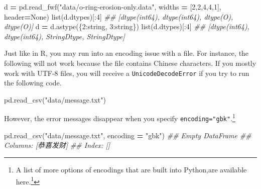 \documentclass[
  12pt,
  krantz2]{krantz}
\makeatletter
\newenvironment{Shaded}{\begin{snugshade}}{\end{snugshade}}
\newcommand{\BuiltInTok}[1]{#1}
\newcommand{\CommentTok}[1]{\textcolor[rgb]{0.37,0.37,0.37}{\textit{#1}}}
\newcommand{\DecValTok}[1]{\textcolor[rgb]{0.06,0.06,0.06}{#1}}
\newcommand{\NormalTok}[1]{#1}
\newcommand{\OperatorTok}[1]{\textcolor[rgb]{0.43,0.43,0.43}{\textbf{#1}}}
\newcommand{\StringTok}[1]{\textcolor[rgb]{0.5,0.5,0.5}{#1}}
\newcommand{\VariableTok}[1]{\textcolor[rgb]{0,0,0}{#1}}
\renewcommand{\href}[2]{#2\footnote{\url{#1}}}
\newenvironment{kframe}{%
\medskip{}
\setlength{\fboxsep}{.8em}
 \def\at@end@of@kframe{}%
 \ifinner\ifhmode%
  \def\at@end@of@kframe{\end{minipage}}%
  \begin{minipage}{\columnwidth}%
 \fi\fi%
 \def\FrameCommand##1{\hskip\@totalleftmargin \hskip-\fboxsep
 \colorbox{shadecolor}{##1}\hskip-\fboxsep
     \hskip-\linewidth \hskip-\@totalleftmargin \hskip\columnwidth}%
 \MakeFramed {\advance\hsize-\width
   \@totalleftmargin\z@ \linewidth\hsize
   \@setminipage}}%
 {\par\unskip\endMakeFramed%
 \at@end@of@kframe}
\renewenvironment{Shaded}{\begin{kframe}}{\end{kframe}}
\makeatother
\begin{document}
\begin{Shaded}
\begin{Highlighting}[]
\NormalTok{d }\OperatorTok{=}\NormalTok{ pd.read\_fwf(}\StringTok{"data/o{-}ring{-}erosion{-}only.data"}\NormalTok{, }
\NormalTok{                  widths }\OperatorTok{=}\NormalTok{ [}\DecValTok{2}\NormalTok{,}\DecValTok{2}\NormalTok{,}\DecValTok{4}\NormalTok{,}\DecValTok{4}\NormalTok{,}\DecValTok{1}\NormalTok{], header}\OperatorTok{=}\VariableTok{None}\NormalTok{)}
\BuiltInTok{list}\NormalTok{(d.dtypes)[:}\DecValTok{4}\NormalTok{]}
\CommentTok{\#\# [dtype(\textquotesingle{}int64\textquotesingle{}), dtype(\textquotesingle{}int64\textquotesingle{}), dtype(\textquotesingle{}O\textquotesingle{}), dtype(\textquotesingle{}O\textquotesingle{})]}
\NormalTok{d }\OperatorTok{=}\NormalTok{ d.astype(\{}\DecValTok{2}\NormalTok{:}\StringTok{\textquotesingle{}string\textquotesingle{}}\NormalTok{, }\DecValTok{3}\NormalTok{:}\StringTok{\textquotesingle{}string\textquotesingle{}}\NormalTok{\}) }
\BuiltInTok{list}\NormalTok{(d.dtypes)[:}\DecValTok{4}\NormalTok{]}
\CommentTok{\#\# [dtype(\textquotesingle{}int64\textquotesingle{}), dtype(\textquotesingle{}int64\textquotesingle{}), StringDtype, StringDtype]}
\end{Highlighting}
\end{Shaded}

Just like in R, you may run into an encoding issue with a file. For instance, the following will not work because the file contains Chinese characters. If you mostly work with UTF-8 files, you will receive a \texttt{UnicodeDecodeError} if you try to run the following code.

\begin{Shaded}
\begin{Highlighting}[]
\NormalTok{pd.read\_csv(}\StringTok{"data/message.txt"}\NormalTok{)}
\end{Highlighting}
\end{Shaded}

However, the error messages disappear when you specify \texttt{encoding="gbk"}.\footnote{A list of more options of encodings that are built into Python,are available \href{https://docs.python.org/3/library/codecs.html\#standard-encodings}{here.}}

\begin{Shaded}
\begin{Highlighting}[]
\NormalTok{pd.read\_csv(}\StringTok{"data/message.txt"}\NormalTok{, encoding }\OperatorTok{=} \StringTok{"gbk"}\NormalTok{)}
\CommentTok{\#\# Empty DataFrame}
\CommentTok{\#\# Columns: [恭喜发财]}
\CommentTok{\#\# Index: []}
\end{Highlighting}
\end{Shaded}
\end{document}
